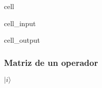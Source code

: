 \documentclass[letterpaper,10pt,english]{jupyterBook}
\newcommand{\ket}[1]{|#1\rangle}
\begin{document}
\begin{sphinxuseclass}{cell}
\begin{sphinxVerbatimInput}
\begin{sphinxuseclass}{cell_input}
\end{sphinxuseclass}\end{sphinxVerbatimInput}
\begin{sphinxVerbatimOutput}

\begin{sphinxuseclass}{cell_output}
\noindent{}

\end{sphinxuseclass}\end{sphinxVerbatimOutput}

\end{sphinxuseclass}

\subsubsection{Matriz de un operador}
\label{\detokenize{docs/Part_01_Formalismo/Chapter_01_02_Formalismo_matem_xe1tico/01_03_Operadores_myst:matriz-de-un-operador}}
\sphinxAtStartPar


\sphinxAtStartPar
{} \(\ket{i}\)
\end{document}
